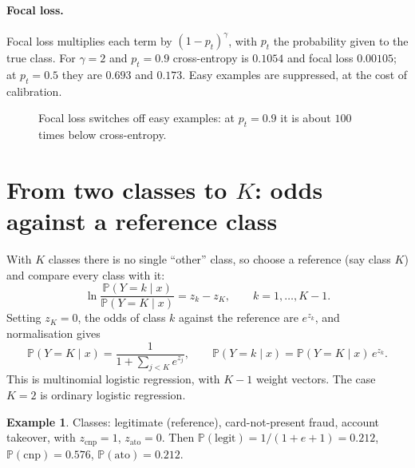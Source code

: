 \documentclass[11pt,a4paper]{article}
\newcommand{\Prob}{\mathbb{P}}
\theoremstyle{definition}
\newtheorem{example}{Example}
\begin{document}
\paragraph{Focal loss.} Focal loss multiplies each term by $(1-p_t)^{\gamma}$, with $p_t$ the probability given to the true class. For $\gamma=2$ and $p_t=0.9$ cross-entropy is $0.1054$ and focal loss $0.00105$; at $p_t=0.5$ they are $0.693$ and $0.173$. Easy examples are suppressed, at the cost of calibration.

\begin{figure}[h]
\centering
{}
\caption{Focal loss switches off easy examples: at $p_t=0.9$ it is about $100$ times below cross-entropy.}
\end{figure}

\section{From two classes to $K$: odds against a reference class}

With $K$ classes there is no single ``other'' class, so choose a reference (say class $K$) and compare every class with it:
\[
\ln\frac{\Prob(Y=k\mid x)}{\Prob(Y=K\mid x)}=z_k-z_K,\qquad k=1,\dots,K-1 .
\]
Setting $z_K=0$, the odds of class $k$ against the reference are $e^{z_k}$, and normalisation gives
\[
\Prob(Y=K\mid x)=\frac{1}{1+\sum_{j<K}e^{z_j}},\qquad \Prob(Y=k\mid x)=\Prob(Y=K\mid x)\,e^{z_k}.
\]
This is multinomial logistic regression, with $K-1$ weight vectors. The case $K=2$ is ordinary logistic regression.

\begin{example}
Classes: legitimate (reference), card-not-present fraud, account takeover, with $z_{\text{cnp}}=1$, $z_{\text{ato}}=0$. Then $\Prob(\text{legit})=1/(1+e+1)=0.212$, $\Prob(\text{cnp})=0.576$, $\Prob(\text{ato})=0.212$.
\end{example}
\end{document}
